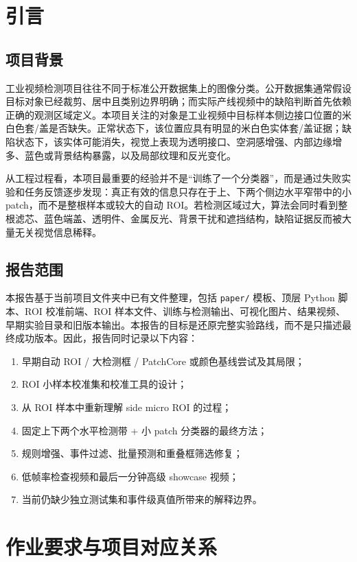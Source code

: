 \documentclass[a4paper,12pt]{article}
\newcommand{\code}[1]{\texttt{#1}}
\begin{document}
\section{引言}
\subsection{项目背景}
工业视频检测项目往往不同于标准公开数据集上的图像分类。公开数据集通常假设目标对象已经裁剪、居中且类别边界明确；而实际产线视频中的缺陷判断首先依赖正确的观测区域定义。本项目关注的对象是工业视频中目标样本侧边接口位置的米白色套/盖是否缺失。正常状态下，该位置应具有明显的米白色实体套/盖证据；缺陷状态下，该实体可能消失，视觉上表现为透明接口、空洞感增强、内部边缘增多、蓝色或背景结构暴露，以及局部纹理和反光变化。

从工程过程看，本项目最重要的经验并不是“训练了一个分类器”，而是通过失败实验和任务反馈逐步发现：真正有效的信息只存在于上、下两个侧边水平窄带中的小 patch，而不是整根样本或较大的自动 ROI。若检测区域过大，算法会同时看到整根滤芯、蓝色端盖、透明件、金属反光、背景干扰和遮挡结构，缺陷证据反而被大量无关视觉信息稀释。

\subsection{报告范围}
本报告基于当前项目文件夹中已有文件整理，包括 \code{paper/} 模板、顶层 Python 脚本、ROI 校准前端、ROI 样本文件、训练与检测输出、可视化图片、结果视频、早期实验目录和旧版本输出。本报告的目标是还原完整实验路线，而不是只描述最终成功版本。因此，报告同时记录以下内容：
\begin{enumerate}[label=\arabic*.]
    \item 早期自动 ROI / 大检测框 / PatchCore 或颜色基线尝试及其局限；
    \item ROI 小样本校准集和校准工具的设计；
    \item 从 ROI 样本中重新理解 side micro ROI 的过程；
    \item 固定上下两个水平检测带 + 小 patch 分类器的最终方法；
    \item 规则增强、事件过滤、批量预测和重叠框筛选修复；
    \item 低帧率检查视频和最后一分钟高级 showcase 视频；
    \item 当前仍缺少独立测试集和事件级真值所带来的解释边界。
\end{enumerate}

\section{作业要求与项目对应关系}
\end{document}
